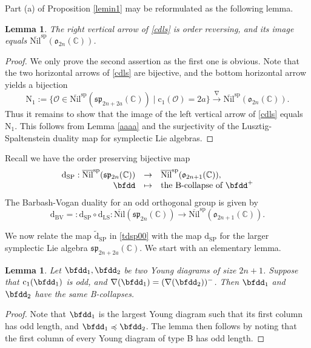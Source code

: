 \documentclass[12pt,a4paper]{amsart}
\newcommand{\BC}{{\mathbb {C}}}
\newcommand{\CO}{{\mathcal {O}}}
\newcommand{\p}{\mathfrak p}
\newcommand{\s}{\mathfrak s}
\renewcommand{\o}{\mathfrak o}
\newcommand{\be}{\begin {equation}}
\newcommand{\ee}{\end {equation}}
\numberwithin{equation}{section}
\newtheorem{lem}[thm]{Lemma}
\theoremstyle{remark}
\begin{document}
Part (a) of Proposition \ref{lemin1} may be reformulated as the following lemma.
\begin{lem}\label{lemin11}
The right vertical arrow of \eqref{cdls} is order reversing, and its image equals $\overline{\mathrm{Nil}}^{\mathrm{sp}}(\o_{2n}(\BC))$.
\end{lem}
\begin{proof}
We only prove the second assertion as the first one is obvious. Note that the two horizontal arrows of \eqref{cdls} are bijective, and the bottom horizontal arrow yields a bijection
\[
   \mathrm N_1:= \{\CO\in \overline{\mathrm{Nil}}^{\mathrm{sp}}(\s\p_{2n+2a}(\BC))\mid \mathrm{c}_1( \CO)=2a\}
             \xrightarrow{ \nabla}  \overline{\mathrm{Nil}}^{\mathrm{sp}}(\o_{2n}(\BC)).
\]
Thus it remains to show that the image of the left vertical arrow of  \eqref{cdls} equals $\mathrm N_1$. This follows from Lemma \ref{aaaa} and the surjectivity of the Lusztig-Spaltenstein duality map for symplectic Lie algebras. %
\end{proof}


Recall we have the order preserving bijective map
\[
\begin{array}{rcl}
  \mathrm d_{\mathrm{SP}}:  \overline{\mathrm{Nil}}^{\mathrm{sp}}(\s\p_{2n}(\BC))&\rightarrow &\overline{\mathrm{Nil}}^{\mathrm{sp}}(\o_{2n+1}(\BC)),\\
     \bfdd & \mapsto &           \textrm{the B-collapse of $\bfdd^+$}
     \end{array}
\]
The Barbash-Vogan duality for an odd orthogonal group is given by
     \[
   \mathrm d_{\mathrm{BV}}=:    \mathrm d_{\mathrm{SP}}\circ \mathrm d_{\mathrm{LS} }: \overline{\mathrm{Nil}}(\s\p_{2n}(\BC))\rightarrow \overline{\mathrm{Nil}}^{\mathrm{sp}}(\o_{2n+1}(\BC)).
\]

We now relate the map $\tilde{ \mathrm d}_{\mathrm{SP}}$ in \eqref{tdsp00} with the map $\mathrm d_{\mathrm{SP}}$ for the larger symplectic Lie algebra $\s\p_{2n+2a}(\BC)$.
We start with an elementary lemma.

\begin{lem}\label{colb}
Let $\bfdd_1, \bfdd_2$ be two Young diagrams of size $2n+1$. Suppose that $\mathrm{c}_1(\bfdd_1)$ is odd, and  $\nabla(\bfdd_1)=(\nabla(\bfdd_2))^-$.   Then $\bfdd_1$ and $\bfdd_2$ have the same B-collapses.
\end{lem}
\begin{proof}
Note that $\bfdd_1$ is the largest Young diagram such that its first column has odd length, and  $\bfdd_1\preccurlyeq \bfdd_2$. The lemma then follows by noting that the first column of every Young diagram of type B has odd length.
\end{proof}
\end{document}
